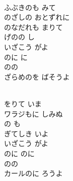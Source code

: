 \documentclass[10pt,b5j]{tarticle} %
\begin{document}
\vspace{1.5em} %
\newcommand{\linespace}{0.5em} %
\newcommand{\blocksize}{0.5\hsize} %
\newcommand{\itemmargin}{3em} %
\begin{enumerate} %
    \setlength{\itemindent}{\itemmargin} %
    \begin{minipage}[c]{\blocksize}
    
        \vspace{\linespace}
        \item~\\
        ふぶきのも みて\\
        のざしの おとずれに\\
        のなだれも まりて\\
        げのの し\\
        いざこう がよ\\
        のに に\\
        のの\\
        ざらめのを ばそうよ
        
    \end{minipage}
    \begin{minipage}[c]{\blocksize}
        
        \vspace{\linespace}
        \item~\\
        をりて いま\\
        ワラジもに しみぬ\\
        の も\\
        ぎてしき いよ\\
        いざこう がよ\\
        のに のに\\
        のの\\
        カールのに ろうよ
        

\end{minipage}
\end{enumerate}
\end{document}

